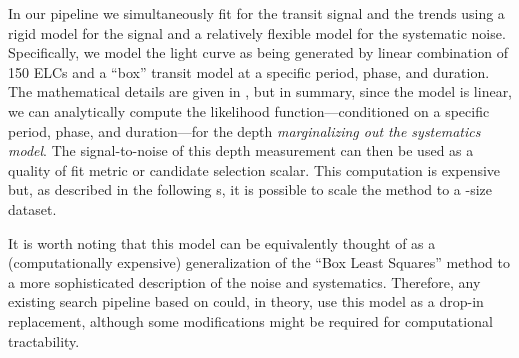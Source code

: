 In our pipeline we simultaneously fit for the transit signal and the trends
using a rigid model for the signal and a relatively flexible model for the
systematic noise.
Specifically, we model the light curve as being generated by linear
combination of 150 ELCs and a ``box'' transit model at a specific period,
phase, and duration.
The mathematical details are given in , but in summary, since the
model is linear, we can analytically compute the likelihood
function---conditioned on a specific period, phase, and duration---for the
depth \emph{marginalizing out the systematics model}.
The signal-to-noise of this depth measurement can then be used as a quality of
fit metric or candidate selection scalar.
This computation is expensive but, as described in the following \sectionname
s, it is possible to scale the method to a \KT-size dataset.

It is worth noting that this model can be equivalently thought of as a
(computationally expensive) generalization of the ``Box Least Squares''
\citep[;][]{Kovacs:2002} method to a more sophisticated
description of the noise and systematics.
Therefore, any existing search pipeline based on  could, in
theory, use this model as a drop-in replacement, although some modifications
might be required for computational tractability.


